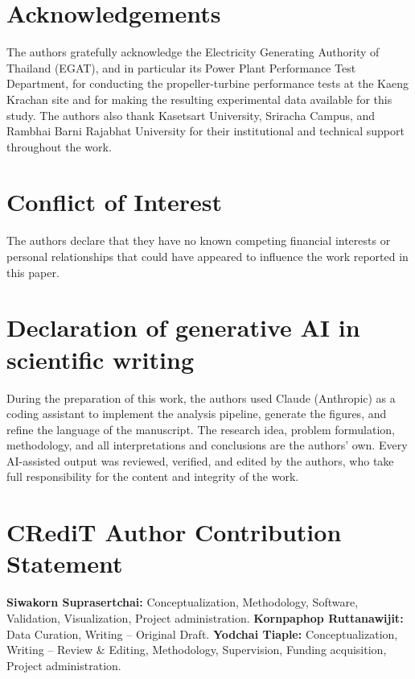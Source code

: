 \documentclass[preprint,12pt]{elsarticle}
\begin{document}
\section*{Acknowledgements}
The authors gratefully acknowledge the Electricity Generating Authority of Thailand
(EGAT), and in particular its Power Plant Performance Test Department, for conducting
the propeller-turbine performance tests at the Kaeng Krachan site and for making the
resulting experimental data available for this study. The authors also thank Kasetsart
University, Sriracha Campus, and Rambhai Barni Rajabhat University for their
institutional and technical support throughout the work.

\section*{Conflict of Interest}
The authors declare that they have no known competing financial interests or personal
relationships that could have appeared to influence the work reported in this paper.

\section*{Declaration of generative AI in scientific writing}
During the preparation of this work, the authors used Claude (Anthropic) as a coding
assistant to implement the analysis pipeline, generate the figures, and refine the
language of the manuscript. The research idea, problem formulation, methodology, and
all interpretations and conclusions are the authors' own. Every AI-assisted output was
reviewed, verified, and edited by the authors, who take full responsibility for the
content and integrity of the work.

\section*{CRediT Author Contribution Statement}
\textbf{Siwakorn Suprasertchai:} Conceptualization, Methodology, Software, Validation,
Visualization, Project administration. \textbf{Kornpaphop Ruttanawijit:} Data
Curation, Writing -- Original Draft. \textbf{Yodchai Tiaple:} Conceptualization,
Writing -- Review \& Editing, Methodology, Supervision, Funding acquisition, Project
administration.



\end{document}
